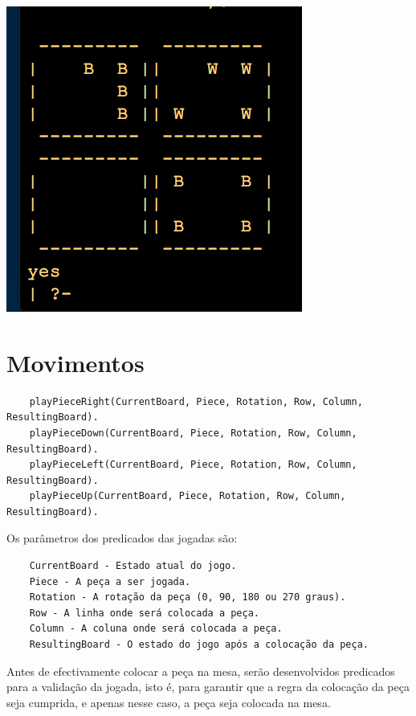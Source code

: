 \documentclass[a4paper]{article}
\begin{document}
\includegraphics[scale=0.5]{../printscreens/intermediate_board.png} \linebreak

\section{Movimentos}

\begin{lstlisting}
	playPieceRight(CurrentBoard, Piece, Rotation, Row, Column, ResultingBoard).
	playPieceDown(CurrentBoard, Piece, Rotation, Row, Column, ResultingBoard).
	playPieceLeft(CurrentBoard, Piece, Rotation, Row, Column, ResultingBoard).
	playPieceUp(CurrentBoard, Piece, Rotation, Row, Column, ResultingBoard).
\end{lstlisting}

Os parâmetros dos predicados das jogadas são:

\begin{lstlisting}
	CurrentBoard - Estado atual do jogo.
	Piece - A peça a ser jogada.
	Rotation - A rotação da peça (0, 90, 180 ou 270 graus).
	Row - A linha onde será colocada a peça.
	Column - A coluna onde será colocada a peça.
	ResultingBoard - O estado do jogo após a colocação da peça.
\end{lstlisting}

Antes de efectivamente colocar a peça na mesa, serão desenvolvidos predicados para a validação da jogada, isto é, para garantir que a regra da colocação da peça seja cumprida, e apenas nesse caso, a peça seja colocada na mesa.
\end{document}
